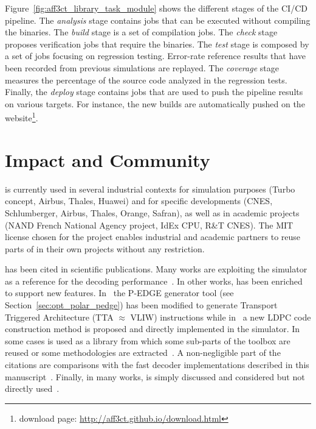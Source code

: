 Figure~\ref{fig:aff3ct_library_task_module} shows the different stages of the
\AFFECT CI/CD pipeline. The \emph{analysis} stage contains jobs that can be
executed without compiling the \AFFECT binaries. The \emph{build} stage is a set
of compilation jobs. The \emph{check} stage proposes verification jobs that
require the \AFFECT binaries. The \emph{test} stage is composed by a set of jobs
focusing on regression testing. Error-rate reference results that have been
recorded from previous simulations are replayed. The \emph{coverage} stage
measures the percentage of the \AFFECT source code analyzed in the regression
tests. Finally, the \emph{deploy} stage contains jobs that are used to push the
pipeline results on various targets. For instance, the new builds are
automatically pushed on the \AFFECT website\footnote{\AFFECT download page:
\url{http://aff3ct.github.io/download.html}}.

\section{Impact and Community}
\label{sec:aff3ct_impact}

\AFFECT is currently used in several industrial contexts for simulation purposes
(Turbo concept, Airbus, Thales, Huawei) and for specific developments (CNES,
Schlumberger, Airbus, Thales, Orange, Safran), as well as in academic projects
(NAND French National Agency project, IdEx CPU, R\&T CNES). The MIT license
chosen for the project enables industrial and academic partners to reuse parts
of \AFFECT in their own projects without any restriction.

\AFFECT has been cited in scientific publications. Many works are exploiting the
\AFFECT simulator as a reference for the decoding performance~\cite{Pignoly2018,
Poulenard2018,Ghanaatian2018,Wang2019,Hsieh2020,Rush2020,Duffy2020}. In other
works, \AFFECT has been enriched to support new features.
In~\cite{Leonardon2018b} the P-EDGE generator tool (see
Section~\ref{sec:opt_polar_pedge}) has been modified to generate Transport
Triggered Architecture (TTA $\approx$ VLIW) instructions while
in~\cite{Tasdighi2020} a new LDPC code construction method is proposed and
directly implemented in the \AFFECT simulator. In some cases \AFFECT is used as
a library from which some sub-parts of the toolbox are reused or some
methodologies are extracted~\cite{Florian2018,Cavatassi2019a,Cavatassi2019b,
Ercan2020}. A non-negligible part of the citations are comparisons with the fast
decoder implementations described in this manuscript~\cite{Zeng2017,
Leonardon2018a,Guermouche2019,LeGal2019a,Shen2020}. Finally, in many works,
\AFFECT is simply discussed and considered but not directly
used~\cite{Debbabi2016,Debbabi2016a,Ercan2017,Natarajan2018,Cenova2019,
Krainyk2019,Vameghestahbanati2019,Mohammed2019,Shaheen2019,Aly2019,
Delomier2020}.

